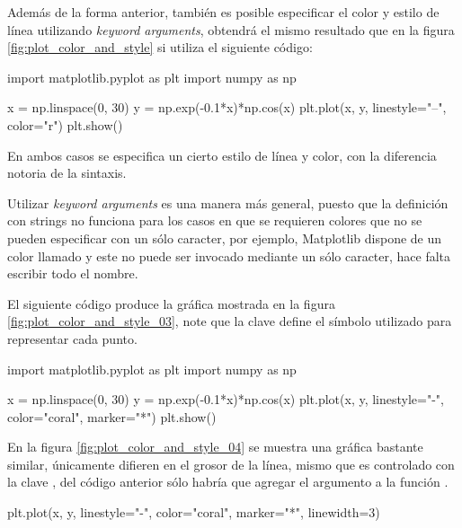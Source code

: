 Además de la forma anterior, también es posible especificar el color y estilo de línea utilizando 
\textit{keyword arguments}, obtendrá el mismo resultado que en la figura \ref{fig:plot_color_and_style} si 
utiliza el siguiente código:

\begin{python}
import matplotlib.pyplot as plt
import numpy as np

x = np.linspace(0, 30)
y = np.exp(-0.1*x)*np.cos(x)
plt.plot(x, y, linestyle="--", color="r")
plt.show()
\end{python}

En ambos casos se especifica un cierto estilo de línea y color, con la diferencia 
notoria de la sintaxis. 

Utilizar \textit{keyword arguments} es una manera más general, puesto que la definición con strings 
no funciona para los casos en que se requieren colores que no se pueden especificar con 
un sólo caracter, por ejemplo, Matplotlib dispone de un color llamado  y 
este no puede ser invocado mediante un sólo caracter, hace falta escribir todo el nombre.

El siguiente código produce la gráfica mostrada en la figura \ref{fig:plot_color_and_style_03}, 
note que la clave  define el símbolo utilizado para representar cada punto. 

\begin{python}
import matplotlib.pyplot as plt
import numpy as np

x = np.linspace(0, 30)
y = np.exp(-0.1*x)*np.cos(x)
plt.plot(x, y, linestyle="-", color="coral", marker="*")
plt.show()
\end{python}

En la figura \ref{fig:plot_color_and_style_04} se muestra una gráfica bastante similar, 
únicamente difieren en el grosor de la línea, mismo que es controlado con la clave 
, del código anterior sólo habría que agregar el argumento  
a la función .

\begin{python}
plt.plot(x, y, linestyle="-", color="coral", marker="*", linewidth=3)
\end{python}


